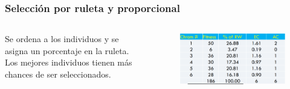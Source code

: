 \documentclass[10pt]{beamer}
\begin{document}
\begin{frame}
  \frametitle{Selección por ruleta y proporcional}

  \begin{columns}
    \begin{column}{0.4\textwidth}
        Se ordena a los individuos y se asigna un porcentaje en la ruleta.
        Los mejores individuos tienen más chances de ser seleccionados.
    \end{column}
    \begin{column}{0.6\textwidth}
      \begin{figure}[!h] 
        \centering
        \includegraphics[width=1\textwidth]{img/ruleta1}
      \end{figure}  
    \end{column}
  \end{columns}

\end{frame}
\end{document}

